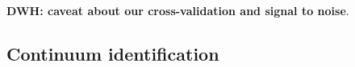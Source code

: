 \documentclass[12pt, preprint]{aastex}
\begin{document}
%







\textbf{DWH: caveat about our cross-validation and signal to noise}. 

\subsection{Continuum identification}
\end{document}
